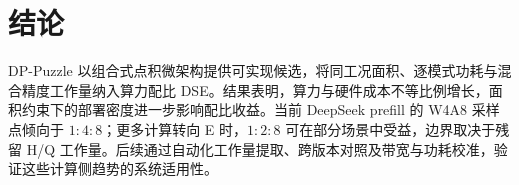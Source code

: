 \section{结论}
\label{sec:conclusion}

DP-Puzzle 以组合式点积微架构提供可实现候选，将同工况面积、逐模式功耗与混合精度工作量纳入算力配比 DSE。结果表明，算力与硬件成本不等比例增长，面积约束下的部署密度进一步影响配比收益。当前 DeepSeek prefill 的 W4A8 采样点倾向于 $1:4:8$；更多计算转向 E 时，$1:2:8$ 可在部分场景中受益，边界取决于残留 H/Q 工作量。后续通过自动化工作量提取、跨版本对照及带宽与功耗校准，验证这些计算侧趋势的系统适用性。
